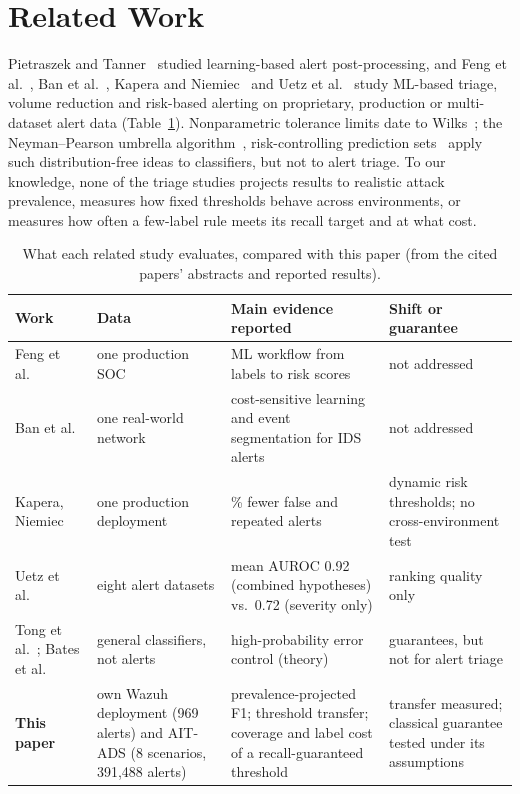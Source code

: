 \documentclass[conference]{IEEEtran}
\begin{document}
\section{Related Work}

Pietraszek and Tanner~\cite{pietraszek2007} studied learning-based alert post-processing, and
Feng et al.~\cite{feng2017}, Ban et al.~\cite{ban2023}, Kapera and Niemiec~\cite{kapera2025} and
Uetz et al.~\cite{uetz2026} study ML-based triage, volume reduction and risk-based alerting on
proprietary, production or multi-dataset alert data (Table~\ref{tab:related}). Nonparametric tolerance limits date to
Wilks~\cite{wilks1941}; the Neyman--Pearson umbrella algorithm~\cite{tong2018}, risk-controlling
prediction sets~\cite{bates2021} apply such distribution-free ideas to classifiers, but not to alert triage. To our knowledge, none of the
triage studies projects results to realistic attack prevalence, measures how fixed thresholds behave across environments, or
measures how often a few-label rule meets its recall target and at what cost.

\begin{table}[t]
\centering\footnotesize\setlength{\tabcolsep}{4pt}\renewcommand{\arraystretch}{1.15}
\caption{What each related study evaluates, compared with this paper (from the cited papers'
abstracts and reported results).}
\label{tab:related}
\begin{tabular}{@{}>{\raggedright\arraybackslash}p{4.3cm}>{\raggedright\arraybackslash}p{3.6cm}>{\raggedright\arraybackslash}p{5.0cm}>{\raggedright\arraybackslash}p{4.4cm}@{}}
\toprule
Work & Data & Main evidence reported & Shift or guarantee \\
\midrule
Feng et al.~\cite{feng2017} & one production SOC & ML workflow from labels to risk scores & not addressed \\
Ban et al.~\cite{ban2023} & one real-world network & cost-sensitive learning and event segmentation for IDS alerts & not addressed \\
Kapera, Niemiec~\cite{kapera2025} & one production deployment & 26\% fewer false and repeated alerts & dynamic risk thresholds; no cross-environment test \\
Uetz et al.~\cite{uetz2026} & eight alert datasets & mean AUROC 0.92 (combined hypotheses) vs.\ 0.72 (severity only) & ranking quality only \\
Tong et al.~\cite{tong2018}; Bates et al.~\cite{bates2021} & general classifiers, not alerts & high-probability error control (theory) & guarantees, but not for alert triage \\
\midrule
\textbf{This paper} & own Wazuh deployment (969 alerts) and AIT-ADS (8 scenarios, 391,488 alerts) & prevalence-projected F1; threshold transfer; coverage and label cost of a recall-guaranteed threshold & transfer measured; classical guarantee tested under its assumptions \\
\bottomrule
\end{tabular}
\end{table}
\end{document}
